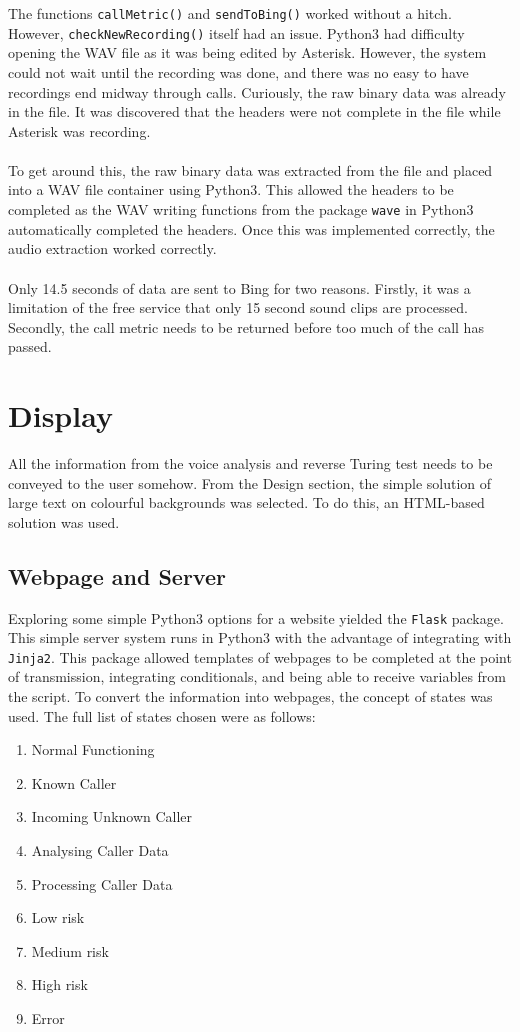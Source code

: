\documentclass[main.tex]{subfiles}
\begin{document}
The functions \texttt{callMetric()} and \texttt{sendToBing()} worked without a hitch. However, \texttt{checkNewRecording()} itself had an issue. Python3 had difficulty opening the WAV file as it was being edited by Asterisk. However, the system could not wait until the recording was done, and there was no easy to have recordings end midway through calls. Curiously, the raw binary data was already in the file. It was discovered that the headers were not complete in the file while Asterisk was recording.
\\\\
To get around this, the raw binary data was extracted from the file and placed into a WAV file container using Python3. This allowed the headers to be completed as the WAV writing functions from the package \texttt{wave} in Python3 automatically completed the headers. Once this was implemented correctly, the audio extraction worked correctly.
\\\\
Only 14.5 seconds of data are sent to Bing for two reasons. Firstly, it was a limitation of the free service that only 15 second sound clips are processed. Secondly, the call metric needs to be returned before too much of the call has passed.

\section{Display}
All the information from the voice analysis and reverse Turing test needs to be conveyed to the user somehow. From the Design section, the simple solution of large text on colourful backgrounds was selected. To do this, an HTML-based solution was used.

\subsection{Webpage and Server}
Exploring some simple Python3 options for a website yielded the \texttt{Flask} package. This simple server system runs in Python3 with the advantage of integrating with \texttt{Jinja2}. This package allowed templates of webpages to be completed at the point of transmission, integrating conditionals, and being able to receive variables from the script. To convert the information into webpages, the concept of states was used. The full list of states chosen were as follows:

\begin{enumerate}
	\item Normal Functioning
	\item Known Caller
	\item Incoming Unknown Caller
	\item Analysing Caller Data
	\item Processing Caller Data
	\item Low risk
	\item Medium risk
	\item High risk
	\item Error
\end{enumerate}
\end{document}
